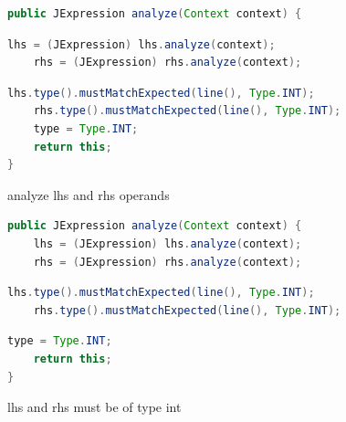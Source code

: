 \documentclass[8pt,a4paper,compress]{beamer}
\begin{document}
\begin{frame}[fragile]
\begin{overprint}
\begin{tcolorbox}[enhanced,drop shadow southwest,sharp corners,size=fbox,colback=white,fontlower=\small\ttfamily,collower=silver900]
\begin{lstlisting}[language=Java,style=focusout]
public JExpression analyze(Context context) {
\end{lstlisting}
\begin{lstlisting}[language=Java,style=focusin,backgroundcolor=\color{lime100}]
    lhs = (JExpression) lhs.analyze(context);
    rhs = (JExpression) rhs.analyze(context);
\end{lstlisting}
\begin{lstlisting}[language=Java,style=focusout]
    lhs.type().mustMatchExpected(line(), Type.INT);
    rhs.type().mustMatchExpected(line(), Type.INT);
    type = Type.INT;
    return this;
}
\end{lstlisting}

\tcblower
\begin{minipage}[t][.2cm][t]{\textwidth}
analyze lhs and rhs operands
\end{minipage}
\end{tcolorbox}

\begin{tcolorbox}[enhanced,drop shadow southwest,sharp corners,size=fbox,colback=white,fontlower=\small\ttfamily,collower=silver900]

\begin{lstlisting}[language=Java,style=focusout]
public JExpression analyze(Context context) {
    lhs = (JExpression) lhs.analyze(context);
    rhs = (JExpression) rhs.analyze(context);
\end{lstlisting}
\begin{lstlisting}[language=Java,style=focusin,backgroundcolor=\color{lime100}]
    lhs.type().mustMatchExpected(line(), Type.INT);
    rhs.type().mustMatchExpected(line(), Type.INT);
\end{lstlisting}
\begin{lstlisting}[language=Java,style=focusout]
    type = Type.INT;
    return this;
}
\end{lstlisting}

\tcblower
\begin{minipage}[t][.2cm][t]{\textwidth}
lhs and rhs must be of type int
\end{minipage}
\end{tcolorbox}

\begin{tcolorbox}[enhanced,drop shadow southwest,sharp corners,size=fbox,colback=white,fontlower=\small\ttfamily,collower=silver900]


\end{tcolorbox}
\end{overprint}
\end{frame}
\end{document}
